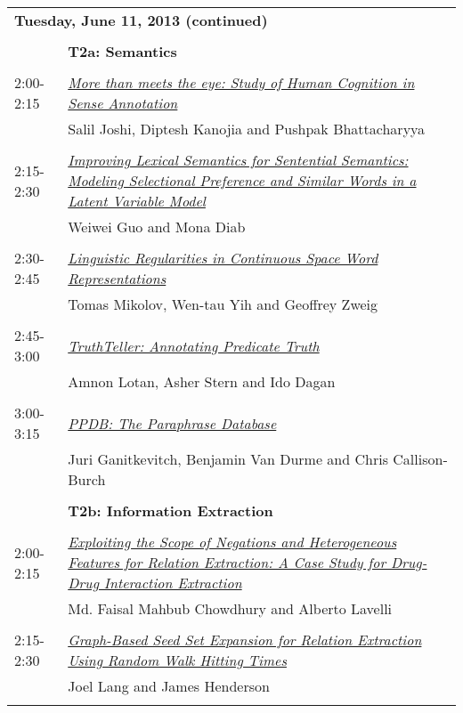 \begin{tabular}{p{20mm}p{138mm}}
\\
\multicolumn{2}{l}{\bf Tuesday, June 11, 2013
 (continued)} \\\\
 & {\bf T2a: Semantics
} \\
\\
2:00-2:15 & \hyperlink{page.733}{\em More than meets the eye: Study of Human Cognition in Sense Annotation}\\
         & Salil Joshi, Diptesh Kanojia and Pushpak Bhattacharyya \\
\\

2:15-2:30 & \hyperlink{page.739}{\em Improving Lexical Semantics for Sentential Semantics: Modeling Selectional Preference and Similar Words in a Latent Variable Model}\\
         & Weiwei Guo and Mona Diab \\
\\

2:30-2:45 & \hyperlink{page.746}{\em Linguistic Regularities in Continuous Space Word Representations}\\
         & Tomas Mikolov, Wen-tau Yih and Geoffrey Zweig \\
\\

2:45-3:00 & \hyperlink{page.752}{\em TruthTeller: Annotating Predicate Truth}\\
         & Amnon Lotan, Asher Stern and Ido Dagan \\
\\

3:00-3:15 & \hyperlink{page.758}{\em PPDB: The Paraphrase Database}\\
         & Juri Ganitkevitch, Benjamin Van Durme and Chris Callison-Burch \\
\\

 & {\bf T2b: Information Extraction
} \\
\\
2:00-2:15 & \hyperlink{page.765}{\em Exploiting the Scope of Negations and Heterogeneous Features for Relation Extraction: A Case Study for Drug-Drug Interaction Extraction}\\
         & Md. Faisal Mahbub Chowdhury and Alberto Lavelli \\
\\

2:15-2:30 & \hyperlink{page.772}{\em Graph-Based Seed Set Expansion for Relation Extraction Using Random Walk Hitting Times}\\
         & Joel Lang and James Henderson \\
\\


\end{tabular}
